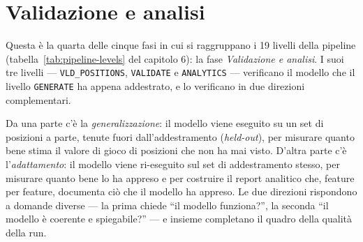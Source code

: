 %
%
%
%
%
%
%
%

%

\chapter{Validazione e analisi}

Questa è la quarta delle cinque fasi in cui si raggruppano i 19 livelli della
pipeline (tabella~\ref{tab:pipeline-levels} del capitolo 6): la fase
\emph{Validazione e analisi}. I suoi tre livelli — \texttt{VLD\_POSITIONS},
\texttt{VALIDATE} e \texttt{ANALYTICS} — verificano il modello che il livello
\texttt{GENERATE} ha appena addestrato, e lo verificano in due direzioni
complementari.

Da una parte c'è la \emph{generalizzazione}: il modello viene eseguito su un
set di posizioni a parte, tenute fuori dall'addestramento (\emph{held-out}),
per misurare quanto bene stima il valore di gioco di posizioni che non ha mai
visto. D'altra parte c'è l'\emph{adattamento}: il modello viene ri-eseguito sul
set di addestramento stesso, per misurare quanto bene lo ha appreso e per
costruire il report analitico che, feature per feature, documenta ciò che il
modello ha appreso. Le due direzioni rispondono a domande diverse — la prima
chiede ``il modello funziona?'', la seconda ``il modello è coerente e
spiegabile?'' — e insieme completano il quadro della qualità della run.

